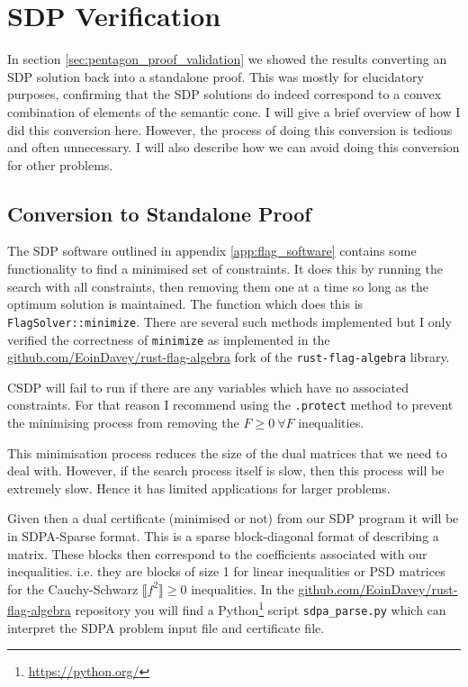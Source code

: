 \chapter{SDP Verification}

In section \ref{sec:pentagon_proof_validation} we showed the results converting an
SDP solution back into a standalone proof. This was mostly for elucidatory purposes,
confirming that the SDP solutions do indeed correspond to a convex combination of elements
of the semantic cone.
I will give a brief overview of how I did this conversion here.
However, the process of doing this conversion is tedious and often
unnecessary. I will also describe how we can avoid doing this conversion for other problems.

\section*{Conversion to Standalone Proof}

The SDP software outlined in appendix \ref{app:flag_software} contains some
functionality to find a minimised set of constraints. It does this by
running the search with all constraints, then removing them one at a time so long as
the optimum solution is maintained. The function which does this is
\verb|FlagSolver::minimize|. There are several such methods implemented but I
only verified the correctness of \verb|minimize| as implemented in the
\url{github.com/EoinDavey/rust-flag-algebra} fork of the \verb|rust-flag-algebra|
library.

\begin{note*}
    CSDP will fail to run if there are any variables which have no associated constraints.
    For that reason I recommend using the \verb|.protect| method to prevent the minimising
    process from removing the $F \geq 0\ \forall F$ inequalities.
\end{note*}

This minimisation process reduces the size of the dual matrices that we need to deal with.
However, if the search process itself is slow, then this process will be extremely slow.
Hence it has limited applications for larger problems.

Given then a dual certificate (minimised or not) from our SDP program it will be in
SDPA-Sparse format. This is a sparse block-diagonal format of describing a matrix.
These blocks then correspond to the coefficients associated with our inequalities. i.e.
they are blocks of size 1 for linear inequalities or PSD matrices for the Cauchy-Schwarz
$\llbracket f^2 \rrbracket \geq 0$ inequalities. In the
\url{github.com/EoinDavey/rust-flag-algebra} repository you will find a
Python\footnote{\url{https://python.org/}} script \verb|sdpa_parse.py| which can
interpret the SDPA problem input file and certificate file.

